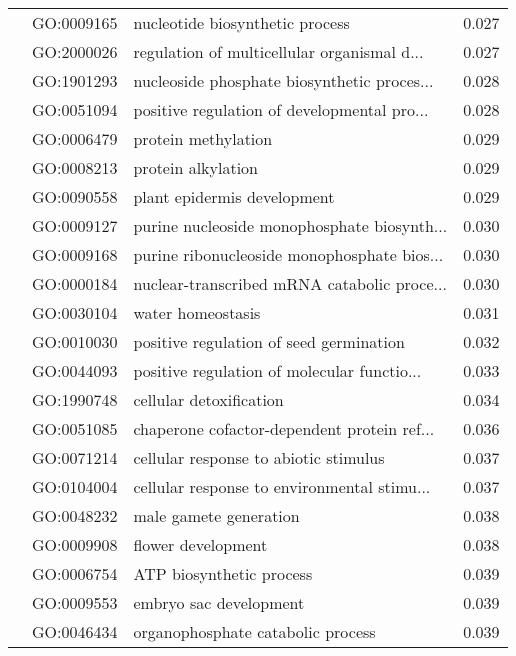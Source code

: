 \begin{longtable}{lllr}
   & GO:0009165 &              nucleotide biosynthetic process &         0.027 \\
   & GO:2000026 &  regulation of multicellular organismal d... &         0.027 \\
   & GO:1901293 &  nucleoside phosphate biosynthetic proces... &         0.028 \\
   & GO:0051094 &  positive regulation of developmental pro... &         0.028 \\
   & GO:0006479 &                          protein methylation &         0.029 \\
   & GO:0008213 &                           protein alkylation &         0.029 \\
   & GO:0090558 &                  plant epidermis development &         0.029 \\
   & GO:0009127 &  purine nucleoside monophosphate biosynth... &         0.030 \\
   & GO:0009168 &  purine ribonucleoside monophosphate bios... &         0.030 \\
   & GO:0000184 &  nuclear-transcribed mRNA catabolic proce... &         0.030 \\
   & GO:0030104 &                            water homeostasis &         0.031 \\
   & GO:0010030 &      positive regulation of seed germination &         0.032 \\
   & GO:0044093 &  positive regulation of molecular functio... &         0.033 \\
   & GO:1990748 &                      cellular detoxification &         0.034 \\
   & GO:0051085 &  chaperone cofactor-dependent protein ref... &         0.036 \\
   & GO:0071214 &        cellular response to abiotic stimulus &         0.037 \\
   & GO:0104004 &  cellular response to environmental stimu... &         0.037 \\
   & GO:0048232 &                       male gamete generation &         0.038 \\
   & GO:0009908 &                           flower development &         0.038 \\
   & GO:0006754 &                     ATP biosynthetic process &         0.039 \\
   & GO:0009553 &                       embryo sac development &         0.039 \\
   & GO:0046434 &            organophosphate catabolic process &         0.039 \\

\end{longtable}
